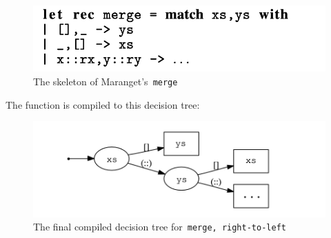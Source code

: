 \documentclass[manuscript,screen, 12pt, nonacm]{acmart}
\begin{document}
  \begin{figure}[H]
      \includegraphics[scale=0.7]{../images/merge.png}
      \caption{The skeleton of Maranget's~\tt{merge}}
  \end{figure}





  The function is compiled to this decision tree: 

  \begin{figure}[H]
      \includegraphics[scale=0.7]{../images/dtree.png}
      \caption{The final compiled decision tree for~\tt{merge}, right-to-left}
  \end{figure}
\end{document}

